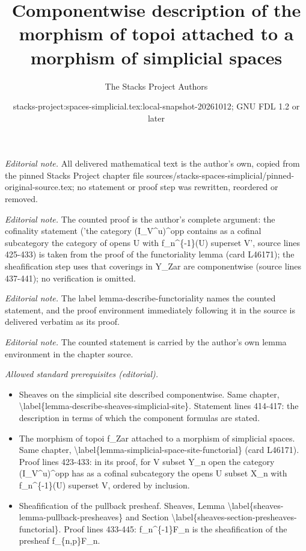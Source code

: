 \documentclass{stacks-project}
\title{Componentwise description of the morphism of topoi attached to a morphism of simplicial spaces}
\author{The Stacks Project Authors}
\date{stacks-project:spaces-simplicial.tex:local-snapshot-20261012; GNU FDL 1.2 or later}
\theoremstyle{plain}
\theoremstyle{definition}
\theoremstyle{remark}
\numberwithin{equation}{subsection}
\begin{document}
\maketitle
\noindent\textit{Editorial note.} All delivered mathematical text is the author's own, copied from the pinned Stacks Project chapter file sources/stacks-spaces-simplicial/pinned-original-source.tex; no statement or proof step was rewritten, reordered or removed.\par\medskip
\noindent\textit{Editorial note.} The counted proof is the author's complete argument: the cofinality statement ('the category (I\_V\textasciicircum{}u)\textasciicircum{}opp contains as a cofinal subcategory the category of opens U with f\_n\textasciicircum{}\{-1\}(U) superset V', source lines 425-433) is taken from the proof of the functoriality lemma (card L46171); the sheafification step uses that coverings in Y\_Zar are componentwise (source lines 437-441); no verification is omitted.\par\medskip
\noindent\textit{Editorial note.} The label lemma-describe-functoriality names the counted statement, and the proof environment immediately following it in the source is delivered verbatim as its proof.\par\medskip
\noindent\textit{Editorial note.} The counted statement is carried by the author's own lemma environment in the chapter source.\par\medskip
\noindent\textit{Allowed standard prerequisites (editorial).}\begin{itemize}
\item Sheaves on the simplicial site described componentwise. Same chapter, \textbackslash{}label\{lemma-describe-sheaves-simplicial-site\}. Statement lines 414-417: the description in terms of which the component formulas are stated.
\item The morphism of topoi f\_Zar attached to a morphism of simplicial spaces. Same chapter, \textbackslash{}label\{lemma-simplicial-space-site-functorial\} (card L46171). Proof lines 423-433: in its proof, for V subset Y\_n open the category (I\_V\textasciicircum{}u)\textasciicircum{}opp has as a cofinal subcategory the opens U subset X\_n with f\_n\textasciicircum{}\{-1\}(U) superset V, ordered by inclusion.
\item Sheafification of the pullback presheaf. Sheaves, Lemma \textbackslash{}label\{sheaves-lemma-pullback-presheaves\} and Section \textbackslash{}label\{sheaves-section-presheaves-functorial\}. Proof lines 433-445: f\_n\textasciicircum{}\{-1\}F\_n is the sheafification of the presheaf f\_\{n,p\}F\_n.
\end{itemize}\medskip
\end{document}
